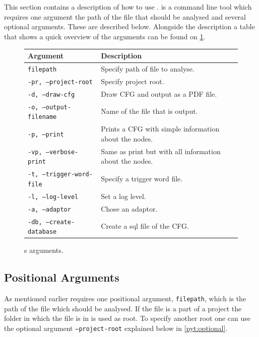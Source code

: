 \section{\pyt}
This section contains a description of how to use \pyt{}.
\pyt{} is a command line tool which requires one argument the path of the file that should be analysed and several optional arguments.
These are described below.
Alongside the description a table that shows a quick overview of the arguments can be found on \cref{pyt:arguments_overview}.

\newcommand{\pytarg}[2]{
  \texttt{#1} & #2.
}
\begin{figure}
  \begin{tabular}{l | l}
    \textbf{Argument} & \textbf{Description} \\
    \hline
    \pytarg{filepath}{Specify path of file to analyse} \\
    \pytarg{-pr, --project-root}{Specify project root} \\
    \pytarg{-d, --draw-cfg}{Draw CFG and output as a PDF file} \\
    \pytarg{-o, --output-filename}{Name of the file that is output} \\
    \pytarg{-p, --print}{Prints a CFG with simple information about the nodes} \\
    \pytarg{-vp, --verbose-print}{Same as print but with all information about the nodes} \\
    \pytarg{-t, --trigger-word-file}{Specify a trigger word file} \\
    \pytarg{-l, --log-level}{Set a log level} \\
    \pytarg{-a, --adaptor}{Chose an adaptor} \\
    \pytarg{-db, --create-database}{Create a sql file of the CFG} \\
    
\end{tabular}
  \centering
  \caption{\pyt{}s arguments.}
  \label{pyt:arguments_overview}
\end{figure}


\subsection{Positional Arguments}
As mentioned earlier \pyt{} requires one positional argument, \texttt{filepath}, which is the path of the file which should be analysed.
If the file is a part of a project the folder in which the file is in is used as root.
To specify another root one can use the optional argument \texttt{--project-root} explained below in \cref{pyt:optional}.

